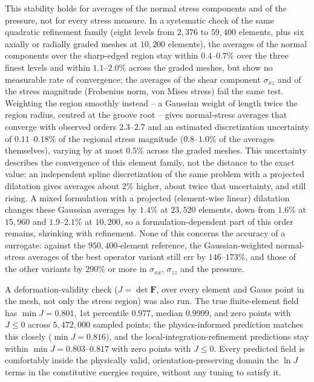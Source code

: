 \documentclass[final,5p,times]{elsarticle}
\begin{document}
This stability holds for averages of the normal stress components and of
the pressure, not for every stress measure. In a systematic check of the
same quadratic refinement family (eight levels from $2{,}376$ to $59{,}400$
elements, plus six axially or radially graded meshes at $10{,}200$
elements), the averages of the normal components over the sharp-edged
region stay within $0.4$--$0.7\%$ over the three finest levels and within
$1.1$--$2.0\%$ across the graded meshes, but show no measurable rate of
convergence; the averages of the shear component $\sigma_{xz}$ and of the
stress magnitude (Frobenius norm, von Mises stress) fail the same test.
Weighting the region smoothly instead -- a Gaussian weight of length twice
the region radius, centred at the groove root -- gives normal-stress
averages that converge with observed orders $2.3$--$2.7$ and an estimated
discretization uncertainty of $0.11$--$0.18\%$ of the regional stress
magnitude ($0.8$--$1.0\%$ of the averages themselves), varying by at most $0.5\%$ across the graded meshes. This
uncertainty describes the convergence of this element family, not the
distance to the exact value: an independent spline discretization of the
same problem with a projected dilatation gives averages about $2\%$ higher,
about twice that uncertainty, and still rising. A mixed
formulation with a projected (element-wise linear) dilatation changes
these Gaussian averages by $1.4\%$ at $23{,}520$ elements, down from
$1.6\%$ at $15{,}960$ and $1.9$--$2.1\%$ at $10{,}200$, so a formulation-dependent
part of this order remains, shrinking with refinement. None of this concerns the accuracy of a surrogate: against the
$950{,}400$-element reference, the Gaussian-weighted normal-stress
averages of the best operator variant still err by $146$--$173\%$, and
those of the other variants by $290\%$ or more in $\sigma_{xx}$, $\sigma_{zz}$
and the pressure.

A deformation-validity check ($J=\det\mathbf{F}$, over every element and
Gauss point in the mesh, not only the stress region) was also run. The
true finite-element field has $\min J=0.801$, 1st percentile $0.977$,
median $0.9999$, and zero points with $J\leq0$ across $5{,}472{,}000$
sampled points; the physics-informed prediction matches this closely
($\min J=0.816$), and the local-integration-refinement predictions stay
within $\min J=0.803$--$0.817$ with zero points with $J\leq0$. Every
predicted field is comfortably inside the physically valid,
orientation-preserving domain the $\ln J$ terms in the constitutive
energies require, without any tuning to satisfy it.
\end{document}
